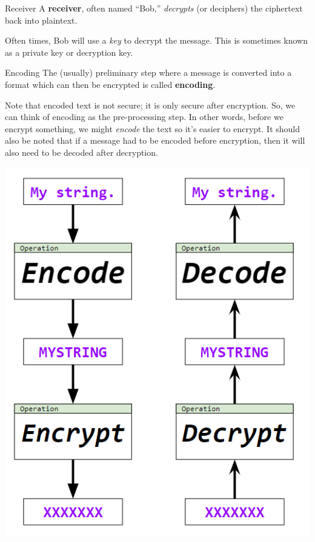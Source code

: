 \documentclass[letterpaper]{article}
\begin{document}
\begin{definition}{Receiver}{}
    A \textbf{receiver}, often named ``Bob,'' \emph{decrypts} (or deciphers) the ciphertext back into plaintext. 
\end{definition}
Often times, Bob will use a \emph{key} to decrypt the message. This is sometimes known as a private key or decryption key.

\begin{definition}{Encoding}{}
    The (usually) preliminary step where a message is converted into a format which can then be encrypted is called \textbf{encoding}. 
\end{definition}
Note that encoded text is not secure; it is only secure after encryption. So, we can think of encoding as the pre-processing step. In other words, before we encrypt something, we might \emph{encode} the text so it's easier to encrypt. It should also be noted that if a message had to be encoded before encryption, then it will also need to be decoded after decryption. 

\begin{center}
    \includegraphics[scale=0.8]{assets/encode_encrypt.png}
\end{center}
\end{document}
